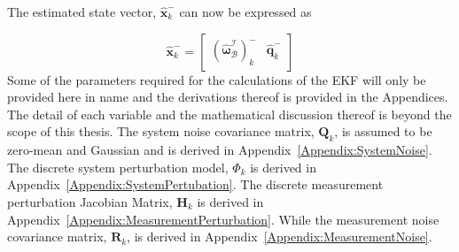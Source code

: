 The estimated state vector, $\hat{\mathbf{x}}_k^-$ can now be expressed as 

\begin{equation}
\hat{\mathbf{x}}_k^- = \begin{bmatrix} (\boldsymbol{\hat{\omega}}_{\mathcal{B}}^{\mathcal{I}})_k^- & \hat{\mathbf{q}}_k^-\end{bmatrix}
\end{equation}
Some of the parameters required for the calculations of the EKF will only be provided here in name and the derivations thereof is provided in the Appendices. The detail of each variable and the mathematical discussion thereof is beyond the scope of this thesis. The system noise covariance matrix, $\mathbf{Q}_k$, is assumed to be zero-mean and Gaussian and is derived in Appendix~\ref{Appendix:SystemNoise}. The discrete system perturbation model, $\Phi_k$ is derived in Appendix~\ref{Appendix:SystemPertubation}. The discrete measurement perturbation Jacobian Matrix, $\mathbf{H}_k$ is derived in Appendix~\ref{Appendix:MeasurementPerturbation}. While the measurement noise covariance matrix, $\mathbf{R}_k$, is derived in Appendix~\ref{Appendix:MeasurementNoise}.

